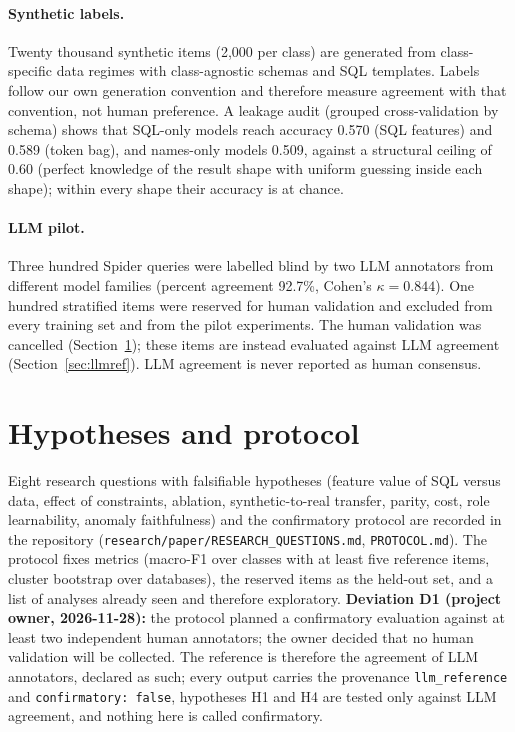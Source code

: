 \documentclass[11pt]{article}
\begin{document}
\paragraph{Synthetic labels.} Twenty thousand synthetic items (2{,}000 per class) are generated from class-specific data regimes with class-agnostic schemas and SQL templates. Labels follow our own generation convention and therefore measure agreement with that convention, not human preference. A leakage audit (grouped cross-validation by schema) shows that SQL-only models reach accuracy 0.570 (SQL features) and 0.589 (token bag), and names-only models 0.509, against a structural ceiling of 0.60 (perfect knowledge of the result shape with uniform guessing inside each shape); within every shape their accuracy is at chance.
\paragraph{LLM pilot.} Three hundred Spider queries were labelled blind by two LLM annotators from different model families (percent agreement 92.7\%, Cohen's $\kappa=0.844$). One hundred stratified items were reserved for human validation and excluded from every training set and from the pilot experiments. The human validation was cancelled (Section~\ref{sec:protocol}); these items are instead evaluated against LLM agreement (Section~\ref{sec:llmref}). LLM agreement is never reported as human consensus.

\section{Hypotheses and protocol}\label{sec:protocol}
Eight research questions with falsifiable hypotheses (feature value of SQL versus data, effect of constraints, ablation, synthetic-to-real transfer, parity, cost, role learnability, anomaly faithfulness) and the confirmatory protocol are recorded in the repository (\texttt{research/paper/RESEARCH\_QUESTIONS.md}, \texttt{PROTOCOL.md}). The protocol fixes metrics (macro-F1 over classes with at least five reference items, cluster bootstrap over databases), the reserved items as the held-out set, and a list of analyses already seen and therefore exploratory. \textbf{Deviation D1 (project owner, 2026-11-28):} the protocol planned a confirmatory evaluation against at least two independent human annotators; the owner decided that no human validation will be collected. The reference is therefore the agreement of LLM annotators, declared as such; every output carries the provenance \texttt{llm\_reference} and \texttt{confirmatory: false}, hypotheses H1 and H4 are tested only against LLM agreement, and nothing here is called confirmatory.
\end{document}
